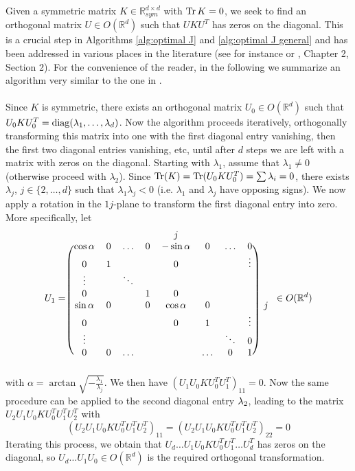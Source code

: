 
Given a symmetric matrix $K\in\mathbb{R}_{sym}^{d\times d}$ with
$\operatorname{Tr} K=0$, we seek to find an orthogonal matrix $U\in O(\mathbb{R}^{d})$
such that $UKU^{T}$ has zeros on the diagonal. This is a crucial
step in Algorithms \ref{alg:optimal J} and \ref{alg:optimal J general}
and has been addressed in various places in the literature (see for
instance \cite{alg_zero_diag} or \cite{Bhatia1997}, Chapter 2,
Section 2). For the convenience of the reader, in the following we
summarize an algorithm very similar to the one in \cite{alg_zero_diag}.
\\\\
Since $K$ is symmetric, there exists an orthogonal matrix $U_{0}\in O(\mathbb{R}^{d})$
such that $U_{0}KU_{0}^{T}=\operatorname{diag}(\lambda_{1},\ldots,\lambda_{d})$.
Now the algorithm proceeds iteratively, orthogonally transforming
this matrix into one with the first diagonal entry vanishing, then
the first two diagonal entries vanishing, etc, until after $d$ steps
we are left with a matrix with zeros on the diagonal. Starting with
$\lambda_{1}$, assume that $\lambda_{1}\neq0$ (otherwise proceed
with $\lambda_{2}$). Since $\operatorname{Tr}(K)=\operatorname{Tr}(U_{0}KU_{0}^{T})=\sum\lambda_{i}=0$,
there exists $\lambda_{j}$, $j\in\{2,\ldots,d\}$ such that $\lambda_{1}\lambda_{j}<0$
(i.e. $\lambda_{1}$ and $\lambda_{j}$ have opposing signs). We now
apply a rotation in the $1j$-plane to transform the first diagonal
entry into zero. More specifically, let 
\[
U_{1}=\begin{blockarray}{ccccccccc}
 ~ & ~ & ~ & ~ & j & ~ & ~ & ~ & ~\\
\begin{block}{(cccccccc)c}
\cos\alpha & 0 & \ldots & 0 & -\sin\alpha & 0 & \ldots & 0 & ~\\
0 & 1 & ~ & ~ & 0 & ~ & ~ & \vdots & ~\\
\vdots & ~ & \ddots & ~ & ~ & ~ & ~ & ~ & ~\\
0 & ~ & ~ & 1 & 0 & ~ & ~ & ~ & ~\\
\sin\alpha & 0 & ~ & 0 & \cos\alpha & 0 & ~ & ~ & j\\
0 & ~ & ~ & ~ & 0 & 1 & ~ & \vdots & ~\\
\vdots & ~ & ~ & ~ & ~ & ~ & \ddots & 0 & ~\\
0 & 0 & \hdots & ~ & ~ & \hdots & 0 & 1 & ~ \\
\end{block}\end{blockarray} \in O(\mathbb{R}^{d})
\]
with $\alpha=\arctan\sqrt{-\frac{\lambda_{1}}{\lambda_{j}}}.$ We
then have $(U_{1}U_{0}KU_{0}^{T}U_{1}^{T})_{11}=0$. Now the same
procedure can be applied to the second diagonal entry $\text{\ensuremath{\lambda}}_{2}$,
leading to the matrix $U_{2}U_{1}U_{0}KU_{0}^{T}U_{1}^{T}U_{2}^{T}$
with 
\[
(U_{2}U_{1}U_{0}KU_{0}^{T}U_{1}^{T}U_{2}^{T})_{11}=(U_{2}U_{1}U_{0}KU_{0}^{T}U_{1}^{T}U_{2}^{T})_{22}=0
\]
Iterating this process, we obtain that $U_{d}\ldots U_{1}U_{0}KU_{0}^{T}U_{1}^{T}\ldots U_{d}^{T}$
has zeros on the diagonal, so $U_{d}\ldots U_{1}U_{0}\in O(\mathbb{R}^{d})$
is the required orthogonal transformation. 

